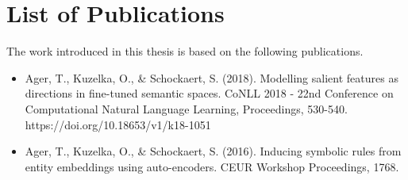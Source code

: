 \newpage
\chapter*{List of Publications}

The work introduced in this thesis is based on the following publications.

\begin{itemize} 

\item Ager, T., Kuzelka, O., & Schockaert, S. (2018). Modelling salient features as directions in fine-tuned semantic spaces. CoNLL 2018 - 22nd Conference on Computational Natural Language Learning, Proceedings, 530-540. https://doi.org/10.18653/v1/k18-1051

\item Ager, T., Kuzelka, O., & Schockaert, S. (2016). Inducing symbolic rules from entity embeddings using auto-encoders. CEUR Workshop Proceedings, 1768.

\end{itemize}